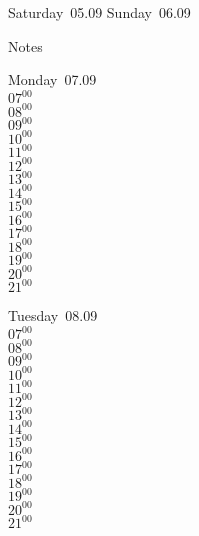 \documentclass[11pt,a4paper]{book}\usepackage[]{graphicx}\usepackage[]{color}
\begin{document}
\begin{weekendbox}
  Saturday~05.09
  \tcblower
  Sunday~06.09
\end{weekendbox} %
\begin{notebox}
  Notes
\end{notebox}
\clearpage
\begin{headerbox}
\end{headerbox}
\begin{weekdaybox}
  Monday~07.09\\
  { 
  \vfill
  $07^{00}$\\
$08^{00}$\\
$09^{00}$\\
$10^{00}$\\
$11^{00}$\\
$12^{00}$\\
$13^{00}$\\
$14^{00}$\\
$15^{00}$\\
$16^{00}$\\
$17^{00}$\\
$18^{00}$\\
$19^{00}$\\
$20^{00}$\\
$21^{00}$\\
  }
\end{weekdaybox}
\begin{weekdaybox}
  Tuesday~08.09\\
  { 
  \vfill
  $07^{00}$\\
$08^{00}$\\
$09^{00}$\\
$10^{00}$\\
$11^{00}$\\
$12^{00}$\\
$13^{00}$\\
$14^{00}$\\
$15^{00}$\\
$16^{00}$\\
$17^{00}$\\
$18^{00}$\\
$19^{00}$\\
$20^{00}$\\
$21^{00}$\\
  }
\end{weekdaybox}
\end{document}
